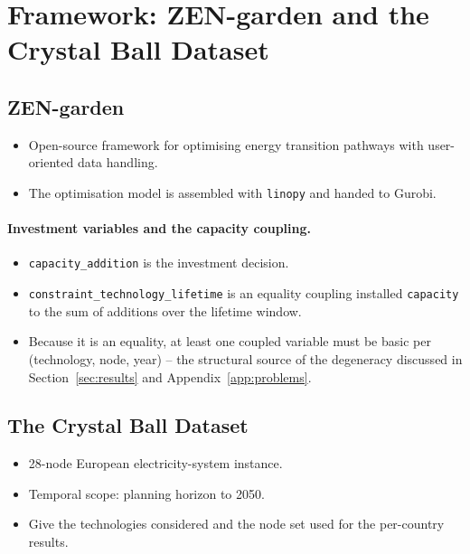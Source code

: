 \section{Framework: ZEN-garden and the Crystal Ball Dataset}
\label{sec:framework}

\subsection{ZEN-garden}
\label{sec:zen-garden}
\begin{itemize}
	\item Open-source framework for optimising energy transition pathways with
	user-oriented data handling.
	\item The optimisation model is assembled with \texttt{linopy} and handed to
	Gurobi.
\end{itemize}

\paragraph{Investment variables and the capacity coupling.}
\begin{itemize}
	\item \texttt{capacity\_addition} is the investment decision.
	\item \texttt{constraint\_technology\_lifetime} is an equality coupling
	installed \texttt{capacity} to the sum of additions over the lifetime window.
	\item Because it is an equality, at least one coupled variable must be basic
	per (technology, node, year) -- the structural source of the degeneracy
	discussed in Section~\ref{sec:results} and Appendix~\ref{app:problems}.
\end{itemize}

\subsection{The Crystal Ball Dataset}
\label{sec:crystal-ball}
\begin{itemize}
	\item 28-node European electricity-system instance.
	\item Temporal scope: planning horizon to 2050.
	\item Give the technologies considered and the node set used for the
	per-country results.
\end{itemize}
